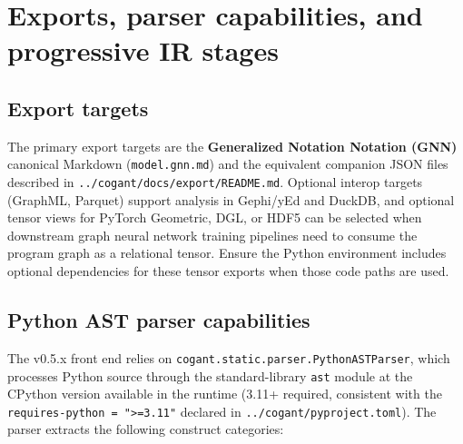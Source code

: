 \documentclass[
]{article}
\begin{document}
\newpage

\section{Exports, parser capabilities, and progressive IR
stages}\label{exports-parser-capabilities-and-progressive-ir-stages}

\subsection{Export targets}\label{export-targets}

The primary export targets are the \textbf{Generalized Notation Notation
(GNN)} canonical Markdown (\texttt{model.gnn.md}) and the equivalent
companion JSON files described in
\texttt{../cogant/docs/export/README.md}. Optional interop targets
(GraphML, Parquet) support analysis in Gephi/yEd and DuckDB, and
optional tensor views for PyTorch Geometric, DGL, or HDF5 can be
selected when downstream graph neural network training pipelines need to
consume the program graph as a relational tensor. Ensure the Python
environment includes optional dependencies for these tensor exports when
those code paths are used.

\subsection{Python AST parser
capabilities}\label{python-ast-parser-capabilities}

The v0.5.x front end relies on
\texttt{cogant.static.parser.PythonASTParser}, which processes Python
source through the standard-library \texttt{ast} module at the CPython
version available in the runtime (3.11+ required, consistent with the
\texttt{requires-python\ =\ "\textgreater{}=3.11"} declared in
\texttt{../cogant/pyproject.toml}). The parser extracts the following
construct categories:
\end{document}
